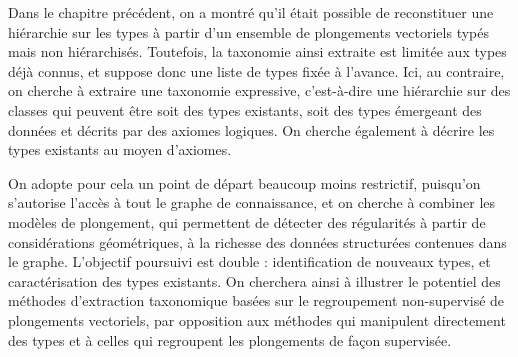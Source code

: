 \label{chap:texp}


Dans le chapitre précédent, on a montré qu'il était possible de reconstituer une hiérarchie sur les types à partir d'un ensemble de plongements vectoriels typés mais non hiérarchisés. Toutefois, la taxonomie ainsi extraite est limitée aux types déjà connus, et suppose donc une liste de types fixée à l'avance. 
Ici, au contraire, on cherche à extraire une taxonomie expressive, c'est-à-dire une hiérarchie sur des classes qui peuvent être soit des types existants, soit des types émergeant des données et décrits par des axiomes logiques. On cherche également à décrire les types existants au moyen d'axiomes.


On adopte pour cela un point de départ beaucoup moins restrictif, puisqu'on s'autorise l'accès à tout le graphe de connaissance, et on cherche à combiner les modèles de plongement, qui permettent de détecter des régularités à partir de considérations géométriques, à la richesse des données structurées contenues dans le graphe. L'objectif poursuivi est double :
%
identification de nouveaux types, et caractérisation des types existants. On cherchera ainsi à illustrer le potentiel des méthodes d'extraction taxonomique basées sur le regroupement non-supervisé de plongements vectoriels, par opposition aux méthodes qui manipulent directement des types et à celles qui regroupent les plongements de façon supervisée.



